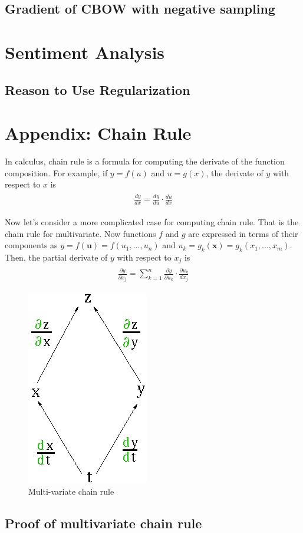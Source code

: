 \documentclass[paper=a4, fontsize=11pt]{scrartcl} %
\numberwithin{equation}{section} %
\numberwithin{figure}{section} %
\numberwithin{table}{section} %
\begin{document}
\subsection{Gradient of CBOW with negative sampling}


\section{Sentiment Analysis}

\subsection{Reason to Use Regularization}

\subsection{}


\section{Appendix: Chain Rule}
In calculus, chain rule is a formula for computing the derivate of the function composition. For example, if $y=f(u)$ and $u=g(x)$, the derivate of  $y$ with respect to $x$ is
\begin{align} 
\begin{split}
	\frac{dy}{dx} = \frac{dy}{du} \cdot \frac{du}{dx}
\end{split}					
\end{align}

Now let's consider a more complicated case for computing chain rule. That is the chain rule for multivariate. Now functions $f$ and $g$ are expressed in terms of their components as $y = f(\boldsymbol{u}) = f(u_{1}, ..., u_{n})$ and $u_{k} = g_{k}(\boldsymbol{x}) = g_{k}(x_{1}, ..., x_{m})$. Then, the partial derivate of $y$ with respect to $x_{j}$ is
\begin{align} 
\begin{split}
	\frac{\partial y}{\partial x_{j}} = \sum_{k=1}^{n} \frac{\partial y}{\partial u_{k}} \cdot \frac{\partial u_{k}}{dx_{j}}
\end{split}					
\end{align}

\begin{figure}
\centering 
\includegraphics[width=0.25\columnwidth]{chainrule}
\caption{Multi-variate chain rule}
\label{fig:gallery} 
\end{figure}

\subsection{Proof of multivariate chain rule}
\end{document}
